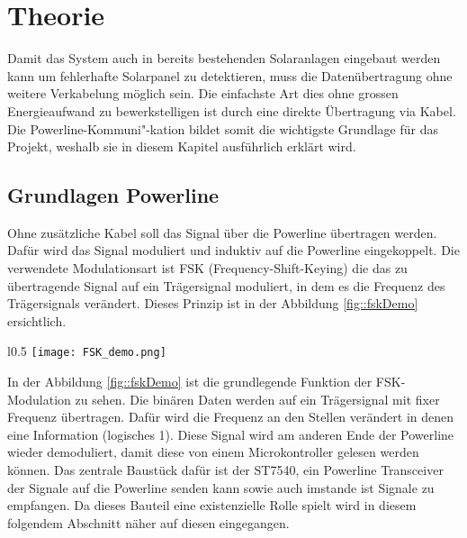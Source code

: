 \section{Theorie}\label{sec::Theorie}

Damit das System auch in bereits bestehenden Solaranlagen eingebaut werden kann um fehlerhafte Solarpanel zu detektieren, muss die Datenübertragung ohne weitere Verkabelung möglich sein. Die einfachste Art dies ohne grossen Energieaufwand zu bewerkstelligen ist durch eine direkte Übertragung via Kabel. Die Powerline-Kommuni"-kation bildet somit die wichtigste Grundlage für das Projekt, weshalb sie in diesem Kapitel ausführlich erklärt wird. 

\subsection{Grundlagen Powerline}
Ohne zusätzliche Kabel soll das Signal über die Powerline übertragen werden. Dafür wird das Signal moduliert und induktiv auf die Powerline eingekoppelt. Die verwendete Modulationsart ist FSK (Frequency-Shift-Keying) die das zu übertragende Signal auf ein Trägersignal moduliert, in dem es die Frequenz des Trägersignals verändert. Dieses Prinzip ist in der Abbildung \ref{fig::fskDemo} ersichtlich.

\begin{wrapfigure}[14]{l}{0.5\textwidth}
\centering
\texttt{[image: FSK\_demo.png]}%
\caption{Prinzip der FSK Modulation \cite{fskDemo_wiki} }
\label{fig::fskDemo}
\end{wrapfigure}

In der Abbildung \ref{fig::fskDemo} ist die grundlegende Funktion der FSK-Modulation zu sehen. Die binären Daten werden auf ein Trägersignal mit fixer Frequenz übertragen. Dafür wird die Frequenz an den Stellen verändert in denen eine Information (logisches 1). Diese Signal wird am anderen Ende der Powerline wieder demoduliert, damit diese von einem Microkontroller gelesen werden können. Das zentrale Baustück dafür ist der ST7540, ein Powerline Transceiver der Signale auf die Powerline senden kann sowie auch imstande ist Signale zu empfangen.  Da dieses Bauteil eine existenzielle Rolle spielt wird in diesem folgendem Abschnitt näher auf diesen eingegangen.
\vspace{110pt}
